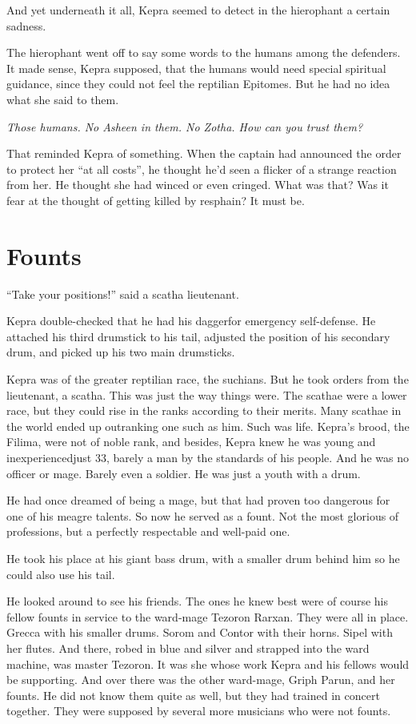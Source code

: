 \documentclass
  [a4paper,
   12pt,
   oneside
  ]%
  {article}
\begin{document}
And yet underneath it all, Kepra seemed to detect in the hierophant a certain sadness.

The hierophant went off to say some words to the humans among the defenders. 
It made sense, Kepra supposed, that the humans would need special spiritual guidance, since they could not feel the reptilian Epitomes. But he had no idea what she said to them.

\emph{Those humans. No Asheen in them. No Zotha. How can you trust them?}

That reminded Kepra of something. 
When the captain had announced the order to protect her ``at all costs'', he thought he'd seen a flicker of a strange reaction from her. 
He thought she had winced or even cringed. 
What was that? 
Was it fear at the thought of getting killed by resphain? 
It must be.



\section{Founts}
``Take your positions!'' said a scatha lieutenant. 

Kepra double-checked that he had his dagger\dash{}for emergency self-defense. 
He attached his third drumstick to his tail, 
adjusted the position of his secondary drum,
and picked up his two main drumsticks.

Kepra was of the greater reptilian race, the suchians. 
But he took orders from the lieutenant, a scatha. 
This was just the way things were. 
The scathae were a lower race, but they could rise in the ranks according to their merits. 
Many scathae in the world ended up outranking one such as him.
Such was life.
Kepra’s brood, the Filima, were not of noble rank, and besides, Kepra knew he was young and inexperienced\dash{}just 33, barely a man by the standards of his people. 
And he was no officer or mage. 
Barely even a soldier. 
He was just a youth with a drum. 

He had once dreamed of being a mage, but that had proven too dangerous for one of his meagre talents. 
So now he served as a fount. Not the most glorious of professions, but a perfectly respectable and well-paid one.

He took his place at his giant bass drum, with a smaller drum behind him so he could also use his tail. 

He looked around to see his friends. 
The ones he knew best were of course his fellow founts in service to the ward-mage Tezoron Rarxan. 
They were all in place. Grecca with his smaller drums. Sorom and Contor with their horns. Sipel with her flutes. 
And there, robed in blue and silver and strapped into the ward machine, was master Tezoron. 
It was she whose work Kepra and his fellows would be supporting. And over there was the other ward-mage, Griph Parun, and her founts. He did not know them quite as well, but they had trained in concert together. 
They were supposed by several more musicians who were not founts.
\end{document}
